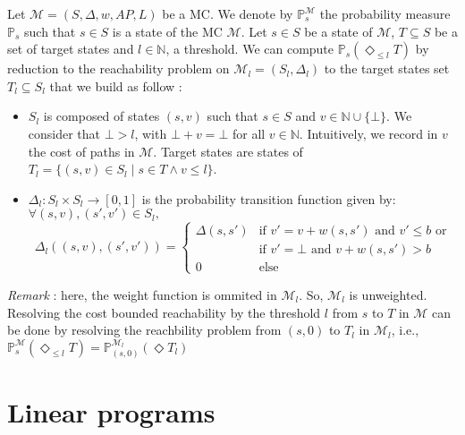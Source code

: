 Let $\mathcal{M} = (S, \Delta, w, AP, L)$ be a MC. We denote by $\mathbb{P}^\mathcal{M}_s$ the probability measure $\mathbb{P}_s$ such that $s \in S$ is a state of the MC $\mathcal{M}$.
Let $s \in S$ be a state of $\mathcal{M}$, $T \subseteq S$ be a set of target states and $l \in \mathbb{N}$, a threshold.
We can compute $\mathbb{P}_s(\Diamond_{\leq l} T)$ by reduction to the reachability problem on $\mathcal{M}_l = (S_l, \Delta_l)$ to the target states set $T_l \subseteq S_l$ that we build as follow :
\begin{itemize}
	\item $S_l$ is composed of states $(s, v)$ such that $s \in S $ and $v \in \mathbb{N} \cup \{ \bot \}$. We consider that $\bot > l$, with $\bot + v = \bot$ for all $v \in \mathbb{N}$. Intuitively, we record in $v$ the cost of paths in $\mathcal{M}$. Target states are states of $T_l = \{ (s, v) \in S_l \; | \; s \in T \wedge v \leq l \}$.
	\item $\Delta_l: S_l \times S_l \rightarrow [0,1]$ is the probability transition function given by:\\
	$\forall (s, v), (s', v') \in S_l,$
	\[
		\Delta_l((s, v), (s', v')) =
		\begin{cases}
		\Delta(s, s') & \text{if $v' = v + w(s, s')$ and $v' \leq b$  or} \\
		 & \text{if $v' = \bot$ and $v + w(s, s') > b$} \\
		 0 & \text{else}
		\end{cases}
	\]
\end{itemize}
\textit{Remark} : here, the weight function is ommited in $\mathcal{M}_l$. So, $\mathcal{M}_l$ is unweighted. \\
Resolving the cost bounded reachability by the threshold $l$ from $s$ to $T$ in $\mathcal{M}$ can be done by resolving the reachbility problem from $(s, 0)$ to $T_l$ in $\mathcal{M}_l$, i.e., $\mathbb{P}^\mathcal{M}_s(\Diamond_{\leq l} T) = \mathbb{P}^{\mathcal{M}_l}_{(s, 0)}(\Diamond T_l)$

\section{Linear programs}
